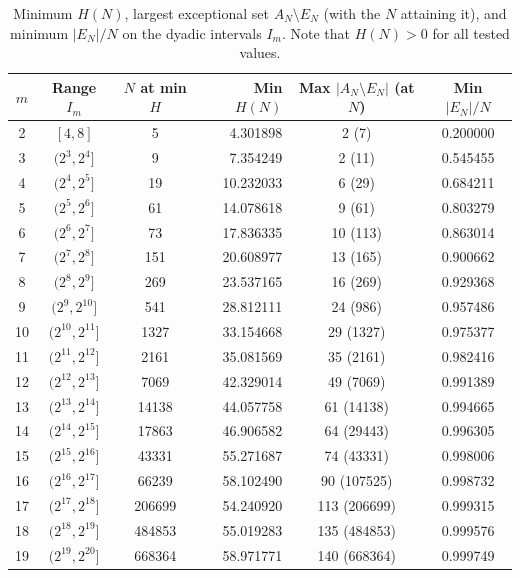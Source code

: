 \documentclass[11pt]{amsart}
\theoremstyle{definition}
\theoremstyle{remark}
\begin{document}
\begin{table}[H]
\caption{Minimum $H(N)$, largest exceptional set $A_N\setminus E_N$ (with the $N$ attaining it), and minimum $|E_N|/N$ on the dyadic intervals $I_m$. Note that $H(N) > 0$ for all tested values.}
\label{tab:gaps}
\footnotesize
\setlength{\tabcolsep}{4pt}
\begin{tabularx}{\textwidth}{cccrcc}
\hline
\textbf{$m$} & \textbf{Range $I_m$} & \textbf{$N$ at min $H$} & \textbf{Min $H(N)$} & \textbf{Max $|A_N\setminus E_N|$ (at $N$)} & \textbf{Min $|E_N|/N$} \\
\hline
2 & $[4,8]$ & 5 & 4.301898 & 2 (7) & 0.200000 \\
3 & $(2^{3},2^{4}]$ & 9 & 7.354249 & 2 (11) & 0.545455 \\
4 & $(2^{4},2^{5}]$ & 19 & 10.232033 & 6 (29) & 0.684211 \\
5 & $(2^{5},2^{6}]$ & 61 & 14.078618 & 9 (61) & 0.803279 \\
6 & $(2^{6},2^{7}]$ & 73 & 17.836335 & 10 (113) & 0.863014 \\
7 & $(2^{7},2^{8}]$ & 151 & 20.608977 & 13 (165) & 0.900662 \\
8 & $(2^{8},2^{9}]$ & 269 & 23.537165 & 16 (269) & 0.929368 \\
9 & $(2^{9},2^{10}]$ & 541 & 28.812111 & 24 (986) & 0.957486 \\
10 & $(2^{10},2^{11}]$ & 1327 & 33.154668 & 29 (1327) & 0.975377 \\
11 & $(2^{11},2^{12}]$ & 2161 & 35.081569 & 35 (2161) & 0.982416 \\
12 & $(2^{12},2^{13}]$ & 7069 & 42.329014 & 49 (7069) & 0.991389 \\
13 & $(2^{13},2^{14}]$ & 14138 & 44.057758 & 61 (14138) & 0.994665 \\
14 & $(2^{14},2^{15}]$ & 17863 & 46.906582 & 64 (29443) & 0.996305 \\
15 & $(2^{15},2^{16}]$ & 43331 & 55.271687 & 74 (43331) & 0.998006 \\
16 & $(2^{16},2^{17}]$ & 66239 & 58.102490 & 90 (107525) & 0.998732 \\
17 & $(2^{17},2^{18}]$ & 206699 & 54.240920 & 113 (206699) & 0.999315 \\
18 & $(2^{18},2^{19}]$ & 484853 & 55.019283 & 135 (484853) & 0.999576 \\
19 & $(2^{19},2^{20}]$ & 668364 & 58.971771 & 140 (668364) & 0.999749 \\
\hline
\end{tabularx}
\end{table}
\end{document}
